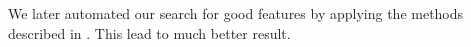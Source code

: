 \documentclass[a4paper, 11pt]{article}
\begin{document}
We later automated our search for good features by applying the methods described in . This lead to much better result.

\end{document}
